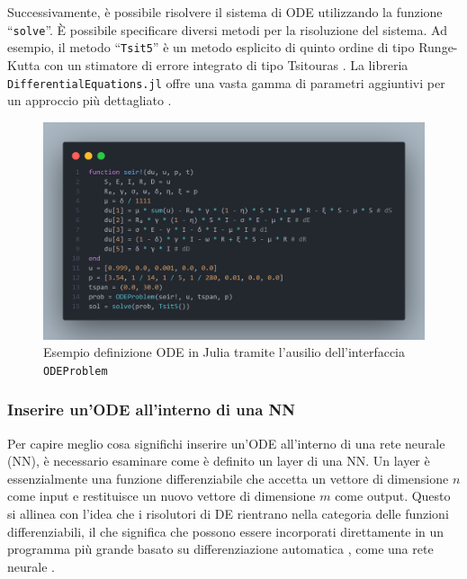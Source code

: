 Successivamente, è possibile risolvere il sistema di ODE utilizzando la 
funzione ``\texttt{solve}''. È possibile specificare diversi metodi per la 
risoluzione del sistema. Ad esempio, il metodo ``\texttt{Tsit5}'' è un metodo 
esplicito di quinto ordine di tipo Runge-Kutta con un stimatore di 
errore integrato di tipo Tsitouras \cite{10.1016/j.camwa.2011.06.002}. 
La libreria \texttt{DifferentialEquations.jl} offre una vasta gamma di parametri 
aggiuntivi per un approccio più dettagliato \cite{rackauckas2017differentialequations}.

\begin{figure}[H]
    \begin{center}
        \includegraphics[scale=0.23]{img/fdefinition.png}
        \caption{Esempio definizione ODE in Julia tramite l'ausilio dell'interfaccia \texttt{ODEProblem}}
        \label{fig:ODE_Julia_example}
    \end{center}
\end{figure}

\subsubsection{Inserire un'ODE all'interno di una NN}

Per capire meglio cosa significhi inserire un'ODE all'interno di una 
rete neurale (NN), è necessario esaminare come è definito un layer di 
una NN. Un layer è essenzialmente una funzione differenziabile che 
accetta un vettore di dimensione $n$ come input e restituisce un nuovo 
vettore di dimensione $m$ come output. Questo si allinea con l'idea che 
i risolutori di DE rientrano nella categoria delle funzioni 
differenziabili, il che significa che possono essere incorporati 
direttamente in un programma più grande basato su differenziazione 
automatica \cite{BARTHOLOMEWBIGGS2000171}, come una rete neurale \cite{innes2018fashionable} \cite{pal2023lux}. 

